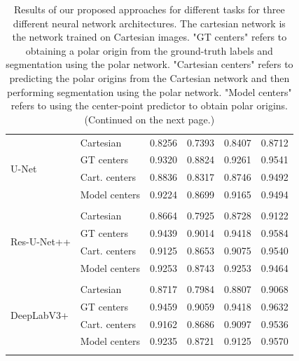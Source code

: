 \begin{table}
\begin{tabular}{l l c c c c}
 \multirow{4}{7em}{{U-Net}}
& Cartesian & 0.8256 & 0.7393 & 0.8407 & 0.8712 \\
& GT centers & 0.9320 & 0.8824 & 0.9261 & 0.9541 \\
& Cart. centers & 0.8836 & 0.8317 & 0.8746 & 0.9492 \\
& Model centers & 0.9224 & 0.8699 & 0.9165 & 0.9494 \\ [1ex]
\hline \\ [-1.5ex]

 \multirow{4}{7em}{{Res-U-Net++}}
& Cartesian & 0.8664 & 0.7925 & 0.8728 & 0.9122 \\
& GT centers & 0.9439 & 0.9014 & 0.9418 & 0.9584 \\
& Cart. centers & 0.9125 & 0.8653 & 0.9075 & 0.9540 \\
& Model centers & 0.9253 & 0.8743 & 0.9253 & 0.9464 \\ [1ex]
\hline \\ [-1.5ex]

 \multirow{4}{7em}{{DeepLabV3+}}
& Cartesian & 0.8717 & 0.7984 & 0.8807 & 0.9068 \\
& GT centers & 0.9459 & 0.9059 & 0.9418 & 0.9632 \\
& Cart. centers & 0.9162 & 0.8686 & 0.9097 & 0.9536 \\
& Model centers & 0.9235 & 0.8721 & 0.9125 & 0.9570 \\ [1ex]
\hline \\ [-1.5ex]
\end{tabular}
\caption{Results of our proposed approaches for different tasks 
for three different neural network architectures. The cartesian network is the network trained on Cartesian images. "GT centers" refers to obtaining a polar origin from the ground-truth labels and segmentation using the polar network. "Cartesian centers" refers to predicting the polar origins from the Cartesian network and then performing segmentation using the polar network. "Model centers" refers to using the center-point predictor to obtain polar origins. (Continued on the next page.)}
\label{table:results}
\end{table}

